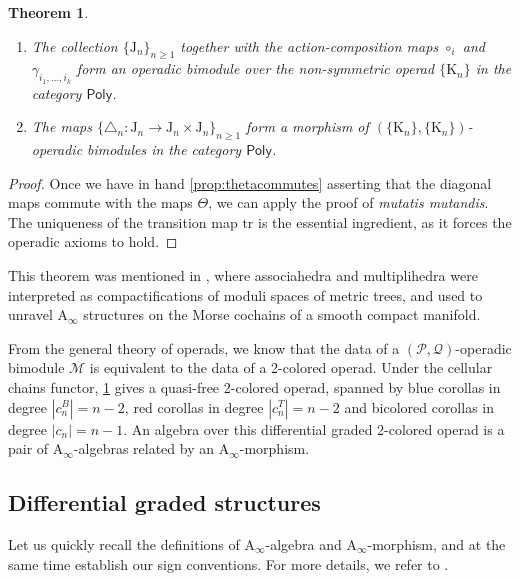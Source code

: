 \documentclass[twoside, 12pt]{amsart}
\newtheorem{theorem}{Theorem}
\theoremstyle{remark}
\newcommand{\K}{\mathrm{K}}
\newcommand{\J}{\mathrm{J}}
\newcommand{\PolySub}{\mathsf{Poly}}
\newcommand{\tr}{\mathrm{tr}}
\begin{document}
\begin{theorem}\label{thm:MainOperad}\leavevmode
\begin{enumerate}
\item The collection $\{\J_n\}_{n\geq 1}$ together with the action-composition maps $\circ_i$ and $\gamma_{i_1,\ldots,i_k}$ form an operadic bimodule over the non-symmetric operad $\{\K_n\}$ in the category $\PolySub$. 

\item The maps $\{\triangle_n : \J_n \to \J_n\times \J_n\}_{n\geq 1}$ form a morphism of $(\{\K_n\},\{\K_n\})$-operadic bimodules in the category $\PolySub$. 
\end{enumerate}
\end{theorem}

\begin{proof}
Once we have in hand \cref{prop:thetacommutes} asserting that the diagonal maps commute with the maps $\Theta$, we can apply the proof of \cite[Theorem~1]{MTTV19} \emph{mutatis mutandis}. The uniqueness of the transition map $\tr$ is the essential ingredient, as it forces the operadic axioms to hold. 
\end{proof}

This theorem was mentioned in \cite{Mazuir21}, where associahedra and multiplihedra were interpreted as compactifications of moduli spaces of metric trees, and used to unravel $\mathrm{A}_\infty$ structures on the Morse cochains of a smooth compact manifold.

\medskip

From the general theory of operads, we know that the data of a $(\mathcal{P},\mathcal{Q})$-operadic bimodule $\mathcal{M}$ is equivalent to the data of a 2-colored operad.
Under the cellular chains functor, \cref{thm:MainOperad} gives a quasi-free 2-colored operad, spanned by blue corollas in degree $|c_n^B|=n-2$, red corollas in degree $|c_n^T|=n-2$ and bicolored corollas in degree $|c_n|=n-1$. An algebra over this differential graded 2-colored operad is a pair of $\mathrm{A}_\infty$-algebras related by an $\mathrm{A}_\infty$-morphism. 




\subsection{Differential graded structures}
Let us quickly recall the definitions of $\mathrm{A}_\infty$-algebra and $\mathrm{A}_\infty$-morphism, and at the same time establish our sign conventions. For more details, we refer to \cite[Chapter 9]{LodayVallette12}.
\end{document}
